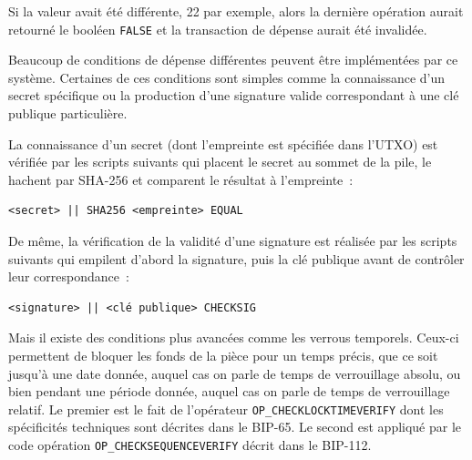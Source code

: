 Si la valeur avait été différente, 22 par exemple, alors la dernière opération aurait retourné le booléen \texttt{FALSE} et la transaction de dépense aurait été invalidée.


Beaucoup de conditions de dépense différentes peuvent être implémentées par ce système. Certaines de ces conditions sont simples comme la connaissance d'un secret spécifique ou la production d'une signature valide correspondant à une clé publique particulière.

La connaissance d'un secret (dont l'empreinte est spécifiée dans l'UTXO) est vérifiée par les scripts suivants qui placent le secret au sommet de la pile, le hachent par SHA-256 et comparent le résultat à l'empreinte~:

\begin{Verbatim}[fontsize=\small]
<secret> || SHA256 <empreinte> EQUAL
\end{Verbatim}

De même, la vérification de la validité d'une signature est réalisée par les scripts suivants qui empilent d'abord la signature, puis la clé publique avant de contrôler leur correspondance~:

\begin{Verbatim}[fontsize=\small]
<signature> || <clé publique> CHECKSIG
\end{Verbatim}

Mais il existe des conditions plus avancées comme les verrous temporels. Ceux-ci permettent de bloquer les fonds de la pièce pour un temps précis, que ce soit jusqu'à une date donnée, auquel cas on parle de temps de verrouillage absolu, ou bien pendant une période donnée, auquel cas on parle de temps de verrouillage relatif. Le premier est le fait de l'opérateur \texttt{OP\_CHECKLOCKTIMEVERIFY} dont les spécificités techniques sont décrites dans le BIP-65. Le second est appliqué par le code opération \texttt{OP\_CHECKSEQUENCEVERIFY} décrit dans le BIP-112.

